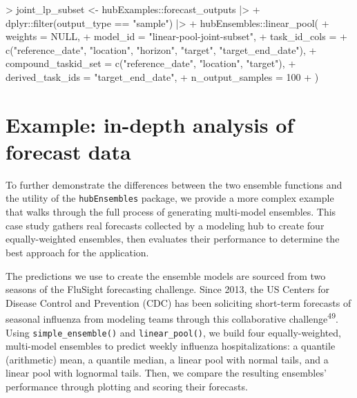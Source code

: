 \documentclass[
]{article}
\newenvironment{Shaded}{\begin{snugshade}}{\end{snugshade}}
\newcommand{\AttributeTok}[1]{\textcolor[rgb]{0.40,0.45,0.13}{#1}}
\newcommand{\ConstantTok}[1]{\textcolor[rgb]{0.56,0.35,0.01}{#1}}
\newcommand{\DecValTok}[1]{\textcolor[rgb]{0.68,0.00,0.00}{#1}}
\newcommand{\FunctionTok}[1]{\textcolor[rgb]{0.28,0.35,0.67}{#1}}
\newcommand{\NormalTok}[1]{\textcolor[rgb]{0.00,0.23,0.31}{#1}}
\newcommand{\OtherTok}[1]{\textcolor[rgb]{0.00,0.23,0.31}{#1}}
\newcommand{\SpecialCharTok}[1]{\textcolor[rgb]{0.37,0.37,0.37}{#1}}
\newcommand{\StringTok}[1]{\textcolor[rgb]{0.13,0.47,0.30}{#1}}
\begin{document}
\begin{Shaded}
\begin{Highlighting}[]
\SpecialCharTok{\textgreater{}}\NormalTok{ joint\_lp\_subset }\OtherTok{\textless{}{-}}\NormalTok{ hubExamples}\SpecialCharTok{::}\NormalTok{forecast\_outputs }\SpecialCharTok{|\textgreater{}}
\SpecialCharTok{+}\NormalTok{   dplyr}\SpecialCharTok{::}\FunctionTok{filter}\NormalTok{(output\_type }\SpecialCharTok{==} \StringTok{"sample"}\NormalTok{) }\SpecialCharTok{|\textgreater{}}
\SpecialCharTok{+}\NormalTok{   hubEnsembles}\SpecialCharTok{::}\FunctionTok{linear\_pool}\NormalTok{(}
\SpecialCharTok{+}     \AttributeTok{weights =} \ConstantTok{NULL}\NormalTok{,}
\SpecialCharTok{+}     \AttributeTok{model\_id =} \StringTok{"linear{-}pool{-}joint{-}subset"}\NormalTok{,}
\SpecialCharTok{+}     \AttributeTok{task\_id\_cols =}
\SpecialCharTok{+}       \FunctionTok{c}\NormalTok{(}\StringTok{"reference\_date"}\NormalTok{, }\StringTok{"location"}\NormalTok{, }\StringTok{"horizon"}\NormalTok{, }\StringTok{"target"}\NormalTok{, }\StringTok{"target\_end\_date"}\NormalTok{),}
\SpecialCharTok{+}     \AttributeTok{compound\_taskid\_set =} \FunctionTok{c}\NormalTok{(}\StringTok{"reference\_date"}\NormalTok{, }\StringTok{"location"}\NormalTok{, }\StringTok{"target"}\NormalTok{),}
\SpecialCharTok{+}     \AttributeTok{derived\_task\_ids =} \StringTok{"target\_end\_date"}\NormalTok{,}
\SpecialCharTok{+}     \AttributeTok{n\_output\_samples =} \DecValTok{100}
\SpecialCharTok{+}\NormalTok{   )}
\end{Highlighting}
\end{Shaded}

\section{Example: in-depth analysis of forecast
data}\label{sec-case-study}

To further demonstrate the differences between the two ensemble
functions and the utility of the \texttt{hubEnsembles} package, we
provide a more complex example that walks through the full process of
generating multi-model ensembles. This case study gathers real forecasts
collected by a modeling hub to create four equally-weighted ensembles,
then evaluates their performance to determine the best approach for the
application.

The predictions we use to create the ensemble models are sourced from
two seasons of the FluSight forecasting challenge. Since 2013, the US
Centers for Disease Control and Prevention (CDC) has been soliciting
short-term forecasts of seasonal influenza from modeling teams through
this collaborative challenge\textsuperscript{49}. Using
\texttt{simple\_ensemble()} and \texttt{linear\_pool()}, we build four
equally-weighted, multi-model ensembles to predict weekly influenza
hospitalizations: a quantile (arithmetic) mean, a quantile median, a
linear pool with normal tails, and a linear pool with lognormal tails.
Then, we compare the resulting ensembles' performance through plotting
and scoring their forecasts.
\end{document}
